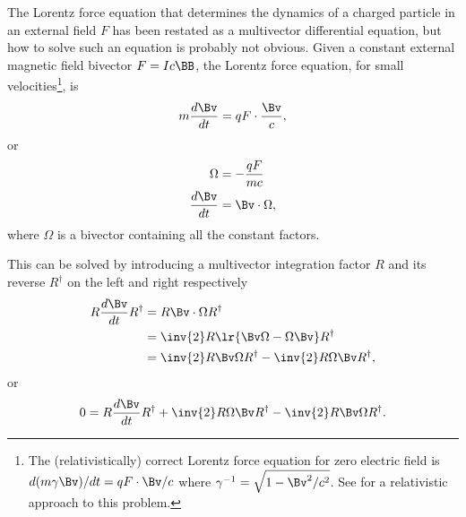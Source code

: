 %
%

The Lorentz force equation that determines the dynamics of a charged particle in an external field \( F \) has been restated as a multivector differential equation, but how to solve such an equation is probably not obvious.
Given a constant external magnetic field bivector \( F = I c \BB \), the Lorentz force equation, for small velocities\footnote{The (relativistically) correct Lorentz force equation for zero electric field is \( d(m \gamma \Bv)/dt = q F \cdot \Bv/c \) where \( \gamma^{-1} = \sqrt{1 - \Bv^2/c^2}\).  See \citep{doran2003gap} for a relativistic approach to this problem.}, is
\begin{equation}\label{eqn:lorentzForce_constantMagnetic:60}
m \frac{d\Bv}{dt} = q F \cdot \frac{\Bv}{c},
\end{equation}
or
\begin{equation}\label{eqn:lorentzForce_constantMagnetic:80}
\begin{aligned}
\Omega &= -\frac{q F}{m c} \\
\frac{d\Bv}{dt} &= \Bv \cdot \Omega,
\end{aligned}
\end{equation}
where \( \Omega \) is a bivector containing all the constant factors.

This can be solved by introducing a multivector integration factor \( R \) and its reverse \( R^\dagger \) on the left and right respectively
\begin{equation}\label{eqn:lorentzForce_constantMagnetic:100}
\begin{aligned}
R \frac{d\Bv}{dt} R^\dagger
&= R \Bv \cdot \Omega R^\dagger \\
&= \inv{2} R \lr{ \Bv \Omega - \Omega \Bv} R^\dagger \\
&= \inv{2} R \Bv \Omega R^\dagger - \inv{2} R \Omega \Bv R^\dagger,
\end{aligned}
\end{equation}
or
\begin{equation}\label{eqn:lorentzForce_constantMagnetic:120}
0 =
R \frac{d\Bv}{dt} R^\dagger
+ \inv{2} R \Omega \Bv R^\dagger
- \inv{2} R \Bv \Omega R^\dagger.
\end{equation}

